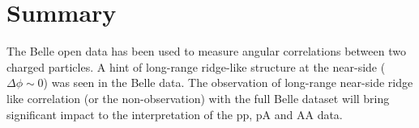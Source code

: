 \section{Summary}

The Belle open data has been used to measure angular correlations between
two charged particles. A hint of long-range ridge-like structure at the
near-side ($\Delta\phi\sim 0$) was seen in the Belle data. The observation of
long-range near-side ridge like correlation (or the non-observation) with the full Belle dataset will bring significant impact to the interpretation of the pp, pA and AA data.

